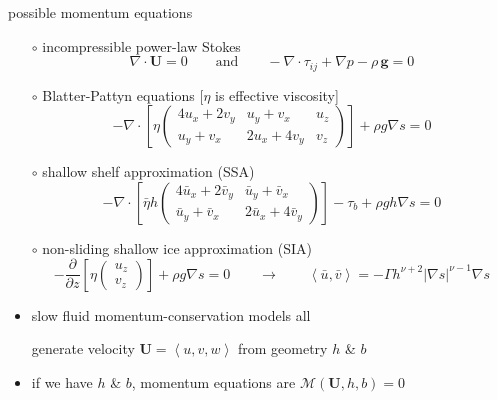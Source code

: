 \documentclass[xcolor={dvipsnames}]{beamer}
\newcommand\bU{\mathbf{U}}
\newcommand\Div{\nabla\cdot}
\newcommand\grad{\nabla}
\newcommand{\ip}[2]{\ensuremath{\left<#1,#2\right>}}
\begin{document}
\begin{frame}{possible momentum equations}

  \begin{itemize}
  \scriptsize
  \item[$\circ$] incompressible power-law Stokes
\begin{equation*}
  \nabla \cdot \bU = 0 \qquad \text{and} \qquad - \nabla \cdot \tau_{ij} + \nabla p - \rho\, \mathbf{g} = 0
\end{equation*}
  \item[$\circ$] Blatter-Pattyn equations [$\eta$ is effective viscosity]
$$-\Div \left[\eta \begin{pmatrix}
4 u_x+2v_y & u_y+v_x   & u_z \\
u_y+v_x    & 2u_x+4v_y & v_z
\end{pmatrix} \right] + \rho g \grad s = 0$$
  \item[$\circ$] shallow shelf approximation (SSA)
$$-\Div \left[\bar \eta h \begin{pmatrix}
4 \bar u_x+2\bar v_y & \bar u_y+\bar v_x   \\
\bar u_y+\bar v_x    & 2\bar u_x+4\bar v_y
\end{pmatrix} \right] - \tau_b + \rho g h \grad s = 0$$
  \item[$\circ$] non-sliding shallow ice approximation (SIA)
$$-\frac{\partial}{\partial z} \left[\eta \begin{pmatrix}
u_z \\
v_z
\end{pmatrix} \right] + \rho g \grad s = 0
\qquad \to \qquad
\ip{\bar u}{\bar v} = -\Gamma h^{\nu+2} |\grad s|^{\nu-1} \grad s$$
  \end{itemize}

\begin{itemize}
\item slow fluid momentum-conservation models all
\begin{center}
\alert{generate velocity $\bU=\left<u,v,w\right>$ from geometry $h$ \& $b$}
\end{center}
\item if we have $h$ \& $b$, momentum equations are $\mathcal{M}(\bU,h,b)=0$
\end{itemize}
\end{frame}
\end{document}
